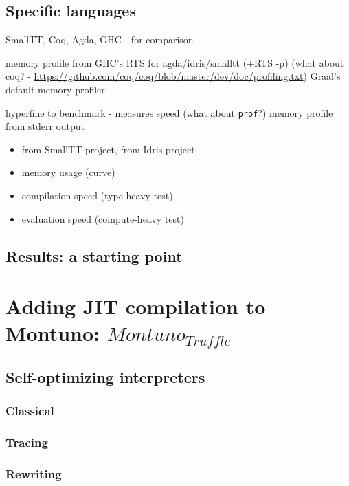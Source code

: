 \documentclass[english,zadani,odsaz]{fitthesis}
\begin{document}
\section{Specific languages}
\label{sec:org3b1dcac}
SmallTT, Coq, Agda, GHC - for comparison

memory profile from GHC's RTS for agda/idris/smalltt (+RTS -p)
(what about coq? - \url{https://github.com/coq/coq/blob/master/dev/doc/profiling.txt})
Graal's default memory profiler

hyperfine to benchmark - measures speed
(what about \texttt{prof}?)
memory profile from stderr output

\begin{itemize}
\item from SmallTT project, from Idris project
\item memory usage (curve)
\item compilation speed (type-heavy test)
\item evaluation speed (compute-heavy test)
\end{itemize}

\section{Results: a starting point}
\label{sec:org4efd256}

\chapter{\label{orgb20d10e}Adding JIT compilation to Montuno: \(Montuno_{Truffle}\)}
\label{sec:org0f1cd89}
\section{Self-optimizing interpreters}
\label{sec:org5cfa740}
\subsection{Classical}
\label{sec:org3f32ded}

\subsection{Tracing}
\label{sec:orgde6ed6e}

\subsection{Rewriting}
\label{sec:orga14026e}
\end{document}
